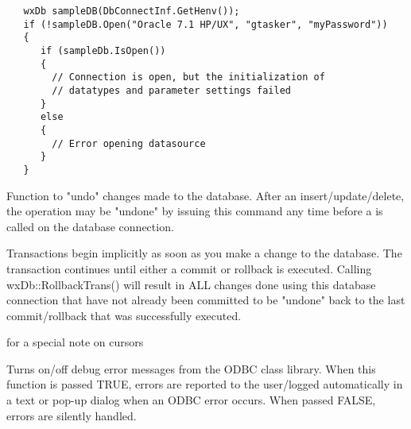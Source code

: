 

\begin{verbatim}
   wxDb sampleDB(DbConnectInf.GetHenv());
   if (!sampleDB.Open("Oracle 7.1 HP/UX", "gtasker", "myPassword"))
   {
      if (sampleDb.IsOpen())
      {
        // Connection is open, but the initialization of
        // datatypes and parameter settings failed
      }
      else
      {
        // Error opening datasource
      }
   }
\end{verbatim}

\label{wxdbrollbacktrans}


Function to "undo" changes made to the database.  After an insert/update/delete, the operation may be "undone" by issuing this command any time before a  is called on the database connection.


Transactions begin implicitly as soon as you make a change to the database.  The
transaction continues until either a commit or rollback is executed.  Calling
wxDb::RollbackTrans() will result in ALL changes done using this database
connection that have not already been committed to be "undone" back to the last
commit/rollback that was successfully executed.



 for a special note on cursors

\label{wxdbsetdebugerrormessages}




Turns on/off debug error messages from the ODBC class library.  When
this function is passed TRUE, errors are reported to the user/logged automatically
in a text or pop-up dialog when an ODBC error occurs.  When passed FALSE,
errors are silently handled.

